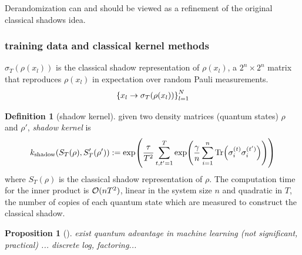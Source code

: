 \documentclass[
aps,
pra,
floatfix,
]{revtex4-2}
\theoremstyle{plain}
\newtheorem{theorem}{Theorem}
\newtheorem{proposition}{Proposition}
\theoremstyle{definition}
\newtheorem{definition}{Definition}
\newcommand{\shadow}{\textup{shadow}}
\newcommand{\dm}{\rho}
\begin{document}
Derandomization can and should be viewed as a refinement of the original classical shadows idea. \cite{huangEfficientEstimationPauli2021} \cite{elbenMixedstateEntanglementLocal2020}

\subsubsection{training data and classical kernel methods}

$\sigma_T(\dm(x_l))$ is the classical shadow representation of $\dm(x_l)$, 
a $2^n\times 2^n$ matrix that reproduces $\dm(x_l)$ in expectation over random Pauli measurements.
\begin{equation}
	\qty{x_l\to\sigma_T(\dm(x_l))}_{l=1}^N
\end{equation}
\begin{definition}[shadow kernel]\label{def:shadow_kernel}
	given two density matrices (quantum states) $\rho$ and $\rho'$,
	\emph{shadow kernel} \cite{huangPredictingManyProperties2020} is 
	\begin{equation}
		k_{\shadow}(S_T(\dm),S_T'(\dm')) := 
		\exp( \frac{\tau}{T^2}
			\sum_{t,t'=1}^{T} \exp( \frac{\gamma}{n} 
			\sum_{i=1}^n \Tr(\sigma_i^{(t)}\sigma_i^{(t')}) ) 
			)
	\end{equation}	
	where $S_T(\dm)$ is the classical shadow representation of $\dm$.
	The computation time for the inner product is $\mathcal{O}(nT^2)$,
	linear in the system size $n$ and quadratic in $T$,
	the number of copies of each quantum state which are measured to construct the classical shadow.
\end{definition}

\begin{proposition}[\cite{huangPowerDataQuantum2021}]
	exist quantum advantage in machine learning (not significant, practical)	...
	discrete log, factoring...
\end{proposition}
\end{document}
